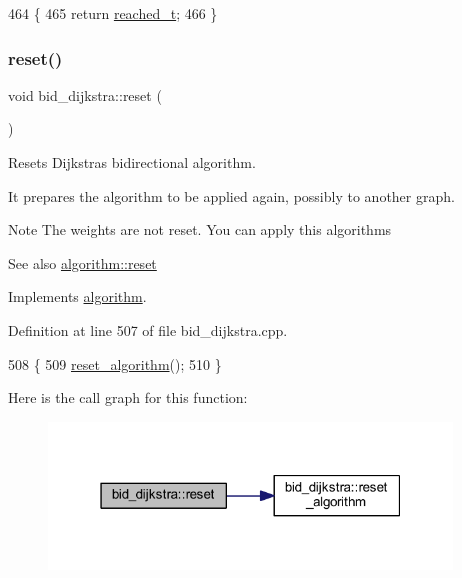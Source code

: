 \begin{DoxyCode}
464 \{
465     \textcolor{keywordflow}{return} \mbox{\hyperlink{classbid__dijkstra_a4714ec557ae9199e88e0242f9c6c2393}{reached\_t}};
466 \}
\end{DoxyCode}
\mbox{\label{classbid__dijkstra_a6df2769941bc73fc5626b084745a2258}} 
\subsubsection{\texorpdfstring{reset()}{reset()}}
{\footnotesize\ttfamily void bid\+\_\+dijkstra\+::reset (\begin{DoxyParamCaption}{ }\end{DoxyParamCaption})\hspace{0.3cm}{\ttfamily [virtual]}}



Resets Dijkstra\textquotesingle{}s bidirectional algorithm. 

It prepares the algorithm to be applied again, possibly to another graph.

\begin{DoxyNote}{Note}
The weights are not reset. You can apply this algorithms
\end{DoxyNote}
\begin{DoxySeeAlso}{See also}
\mbox{\hyperlink{classalgorithm_a21aba63d066ae7897de6ca7d8425c408}{algorithm\+::reset}} 
\end{DoxySeeAlso}


Implements \mbox{\hyperlink{classalgorithm_a21aba63d066ae7897de6ca7d8425c408}{algorithm}}.



Definition at line 507 of file bid\+\_\+dijkstra.\+cpp.


\begin{DoxyCode}
508 \{
509     \mbox{\hyperlink{classbid__dijkstra_a16574970a28a3f453011e5b98d63e191}{reset\_algorithm}}();
510 \}
\end{DoxyCode}
Here is the call graph for this function\+:\nopagebreak
\begin{figure}[H]
\begin{center}
\leavevmode
\includegraphics[width=304pt]{classbid__dijkstra_a6df2769941bc73fc5626b084745a2258_cgraph}
\end{center}
\end{figure}
\mbox{\label{classbid__dijkstra_a16574970a28a3f453011e5b98d63e191}} 
